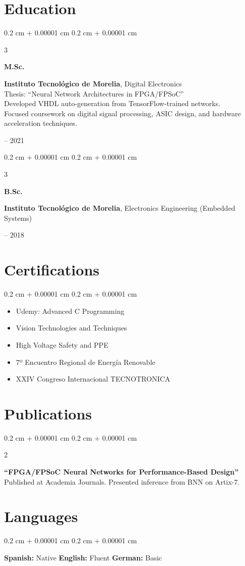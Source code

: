 \documentclass[10pt, letterpaper]{article}
\newenvironment{highlightsforbulletentries}{
    \begin{itemize}[
        topsep=0.10 cm,
        parsep=0.10 cm,
        partopsep=0pt,
        itemsep=0pt,
        leftmargin=10pt
    ]
}{
    \end{itemize}
}
\newenvironment{onecolentry}{
    \begin{adjustwidth}{
        0.2 cm + 0.00001 cm
    }{
        0.2 cm + 0.00001 cm
    }
}{
    \end{adjustwidth}
}
\newenvironment{twocolentry}[2][]{
    \onecolentry
    \def\secondColumn{#2}
    \setcolumnwidth{\fill, 4.5 cm}
    \begin{paracol}{2}
}{
    \switchcolumn \raggedleft \secondColumn
    \end{paracol}
    \endonecolentry
}
\newenvironment{threecolentry}[3][]{
    \onecolentry
    \def\thirdColumn{#3}
    \setcolumnwidth{1 cm, \fill, 4.5 cm}
    \begin{paracol}{3}
    {\raggedright #2} \switchcolumn
}{
    \switchcolumn \raggedleft \thirdColumn
    \end{paracol}
    \endonecolentry
}
\begin{document}
\section{Education}
\begin{threecolentry}{\textbf{M.Sc.}}{
2019 -- 2021
}
\textbf{Instituto Tecnológico de Morelia}, Digital Electronics \\
Thesis: “Neural Network Architectures in FPGA/FPSoC” \\
Developed VHDL auto-generation from TensorFlow-trained networks. \\
Focused coursework on digital signal processing, ASIC design, and hardware acceleration techniques.
\end{threecolentry}

\vspace{0.2 cm}

\begin{threecolentry}{\textbf{B.Sc.}}{
2012 -- 2018
}
\textbf{Instituto Tecnológico de Morelia}, Electronics Engineering (Embedded Systems)
\end{threecolentry}

\section{Certifications}
\begin{onecolentry}
\begin{highlightsforbulletentries}
\item Udemy: Advanced C Programming
\item Vision Technologies and Techniques
\item High Voltage Safety and PPE
\item 7º Encuentro Regional de Energía Renovable
\item XXIV Congreso Internacional TECNOTRONICA
\end{highlightsforbulletentries}
\end{onecolentry}

\section{Publications}
\begin{twocolentry}{
2021
}
\textbf{“FPGA/FPSoC Neural Networks for Performance-Based Design”} \\
Published at Academia Journals. Presented inference from BNN on Artix-7.
\end{twocolentry}

\section{Languages}
\begin{onecolentry}
\textbf{Spanish:} Native \hfill \textbf{English:} Fluent \hfill \textbf{German:} Basic
\end{onecolentry}
\end{document}

